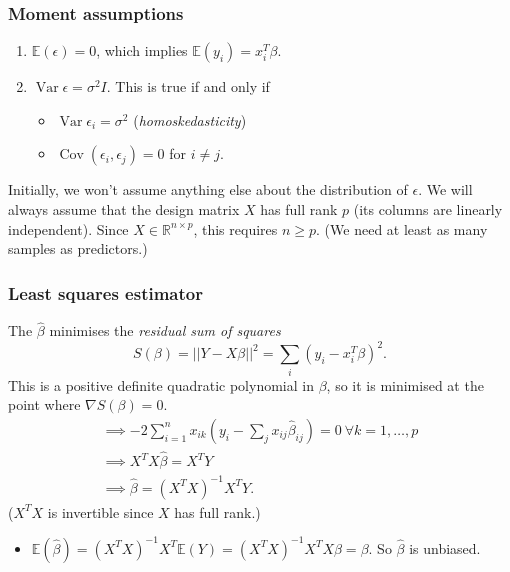 \documentclass[egregdoesnotlikesansseriftitles,a4paper]{scrartcl}
\begin{document}
\subsubsection{Moment assumptions}
\begin{enumerate}
     \item $\mathbb{E}(\epsilon)=0$, which implies $\mathbb{E} (y_{i})=x_{i}^T \beta$.
     \item $\operatorname{Var}\epsilon =\sigma^2 I$. This is true if and only if 
     \begin{itemize}
          \item $\operatorname{Var}\epsilon_{i}=\sigma^2$ (\emph{homoskedasticity})
          \item $\operatorname{Cov}(\epsilon_{i},\epsilon_{j})=0$ for $i \neq j$.
     \end{itemize}
\end{enumerate}
Initially, we won't assume anything else about the distribution of $\epsilon$. We will always assume that the design matrix $X$ has full rank $p$ (its columns are linearly independent). Since $X \in \mathbb{R}^{n \times p}$, this requires $n \geq p$. (We need at least as many samples as predictors.)
\subsubsection{Least squares estimator}
The  $\hat{\beta}$ minimises the \emph{residual sum of squares} \[
S (\beta)= \left|| Y-X \beta\right||^2 = \sum_{i}^{}(y_{i}-x_{i}^T \beta)^2
.\] This is a positive definite quadratic polynomial in $\beta$, so it is minimised at the point where $\nabla S (\beta)=0$. 
\begin{align*}
     \implies -2 \sum_{i=1}^{n}x_{ik}(y_{i}-\sum_{j}^{}x_{ij}\hat{\beta}_{ij})=0 \ \forall k=1 , \ldots, p\\
     \implies X^TX \hat{\beta}=X^{T}Y\\
     \implies \hat{\beta}= (X^TX)^{-1} X^T Y.
\end{align*}
($X^TX$ is invertible since $X$ has full rank.) 
\begin{remarks}
      \begin{itemize}
           \item $\mathbb{E}(\hat{\beta})=(X^TX )^{-1} X^T \mathbb{E}(Y)=(X^TX )^{-1} X^TX  \beta=\beta$. So $\hat{\beta}$ is unbiased.
      \end{itemize}
\end{remarks}
\end{document}
